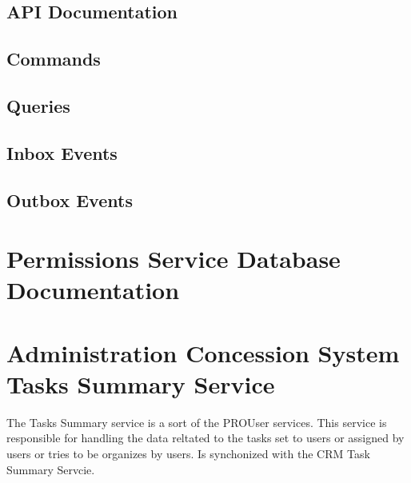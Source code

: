 \documentclass[letterpaper,10pt,english]{sphinxmanual}
\begin{document}


\subsection{API Documentation}
\label{\detokenize{administration_concession_system/permissions_service:api-documentation}}

\subsection{Commands}
\label{\detokenize{administration_concession_system/permissions_service:commands}}

\subsection{Queries}
\label{\detokenize{administration_concession_system/permissions_service:queries}}

\subsection{Inbox Events}
\label{\detokenize{administration_concession_system/permissions_service:inbox-events}}

\subsection{Outbox Events}
\label{\detokenize{administration_concession_system/permissions_service:outbox-events}}

\section{Permissions Service Database Documentation}
\label{\detokenize{administration_concession_system/permissions_service:permissions-service-database-documentation}}
\sphinxstepscope


\section{Administration Concession System Tasks Summary Service}
\label{\detokenize{administration_concession_system/tasks_summary_service:administration-concession-system-tasks-summary-service}}\label{\detokenize{administration_concession_system/tasks_summary_service::doc}}
\sphinxAtStartPar
The Tasks Summary service is a sort of the PRO\sphinxhyphen{}User services. This service is responsible for handling the data reltated to the tasks set to users or assigned by users or tries to be organizes by users. Is synchonized with the CRM Task Summary Servcie.
\end{document}

